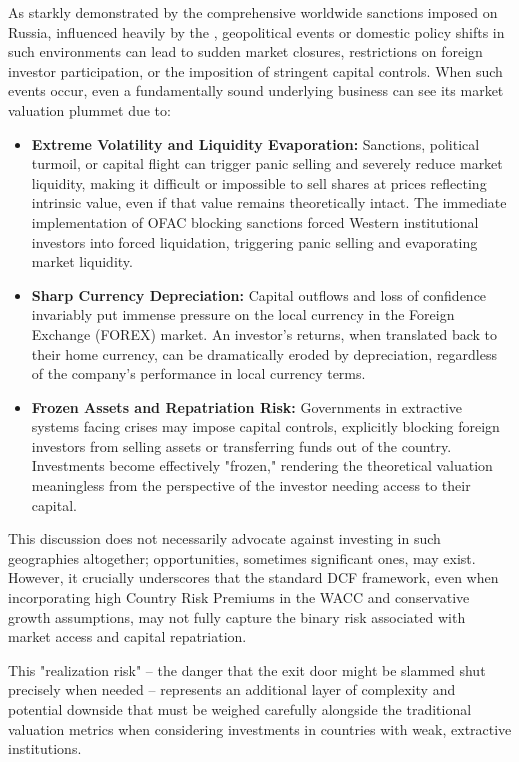 As starkly demonstrated by the comprehensive worldwide sanctions imposed on Russia, influenced heavily by the \textcite{ofac2024russia}, geopolitical events or domestic policy shifts in such environments can lead to sudden market closures, restrictions on foreign investor participation, or the imposition of stringent capital controls. When such events occur, even a fundamentally sound underlying business can see its market valuation plummet due to:
\begin{itemize}
    \item \textbf{Extreme Volatility and Liquidity Evaporation:} Sanctions, political turmoil, or capital flight can trigger panic selling and severely reduce market liquidity, making it difficult or impossible to sell shares at prices reflecting intrinsic value, even if that value remains theoretically intact. The immediate implementation of OFAC blocking sanctions \parencite{ofac2024russia} forced Western institutional investors into forced liquidation, triggering panic selling and evaporating market liquidity.
    \item \textbf{Sharp Currency Depreciation:} Capital outflows and loss of confidence invariably put immense pressure on the local currency in the Foreign Exchange (FOREX) market. An investor's returns, when translated back to their home currency, can be dramatically eroded by depreciation, regardless of the company's performance in local currency terms.
    \item \textbf{Frozen Assets and Repatriation Risk:} Governments in extractive systems facing crises may impose capital controls, explicitly blocking foreign investors from selling assets or transferring funds out of the country. Investments become effectively "frozen," rendering the theoretical valuation meaningless from the perspective of the investor needing access to their capital.
\end{itemize}

This discussion does not necessarily advocate against investing in such geographies altogether; opportunities, sometimes significant ones, may exist. However, it crucially underscores that the standard DCF framework, even when incorporating high Country Risk Premiums in the WACC and conservative growth assumptions, may not fully capture the binary risk associated with market access and capital repatriation. 

This "realization risk" – the danger that the exit door might be slammed shut precisely when needed – represents an additional layer of complexity and potential downside that must be weighed carefully alongside the traditional valuation metrics when considering investments in countries with weak, extractive institutions.
